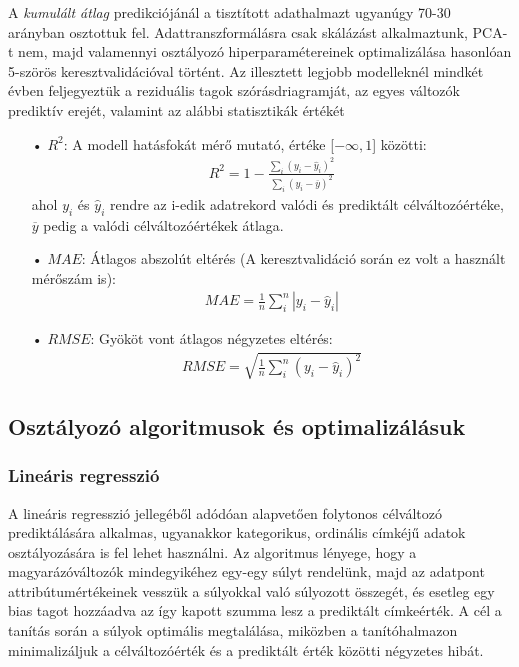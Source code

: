 \documentclass[12pt]{article}
\begin{document}
A \textit{kumulált átlag} predikciójánál a tisztított adathalmazt ugyanúgy 70-30 arányban osztottuk fel. Adattranszformálásra csak skálázást alkalmaztunk, PCA-t nem, majd valamennyi osztályozó hiperparamétereinek optimalizálása hasonlóan 5-szörös keresztvalidációval történt. Az illesztett legjobb modelleknél mindkét évben feljegyeztük a reziduális tagok szórásdriagramját, az egyes változók prediktív erejét, valamint az alábbi statisztikák értékét\cite{bolla_stat}
\begin{itemize}
\item[•] $R^2$: A modell hatásfokát mérő mutató, értéke [$-\infty,1$] közötti:
\begin{align*}
R^2 = 1 - \frac{\sum_i (y_i - \hat{y}_i)^2}{\sum_i (y_i - \overline{y})^2}
\end{align*} 
ahol $y_i$ és $\hat{y}_i$ rendre az i-edik adatrekord valódi és prediktált célváltozóértéke, $\overline{y}$ pedig a valódi célváltozóértékek átlaga.
\item[•] $MAE$: Átlagos abszolút eltérés (A keresztvalidáció során ez volt a használt mérőszám is):
\begin{align*}
MAE = \frac{1}{n}\sum_i^n |y_i -\hat{y}_i| 
\end{align*}
\item[•] $RMSE$: Gyököt vont átlagos négyzetes eltérés:
\begin{align*}
RMSE = \sqrt{\frac{1}{n}\sum_i^n (y_i - \hat{y}_i)^2}
\end{align*}
\end{itemize}






\subsection{Osztályozó algoritmusok és optimalizálásuk}

\subsubsection{Lineáris regresszió}

A lineáris regresszió jellegéből adódóan alapvetően folytonos célváltozó prediktálására alkalmas, ugyanakkor kategorikus, ordinális címkéjű adatok osztályozására is fel lehet használni. Az algoritmus lényege, hogy a magyarázóváltozók mindegyikéhez egy-egy súlyt rendelünk, majd az adatpont attribútumértékeinek vesszük a súlyokkal való súlyozott összegét, és esetleg egy bias tagot hozzáadva az így kapott szumma lesz a prediktált címkeérték. A cél a tanítás során a súlyok optimális megtalálása, miközben a tanítóhalmazon minimalizáljuk a célváltozóérték és a prediktált érték közötti négyzetes hibát.
\end{document}

